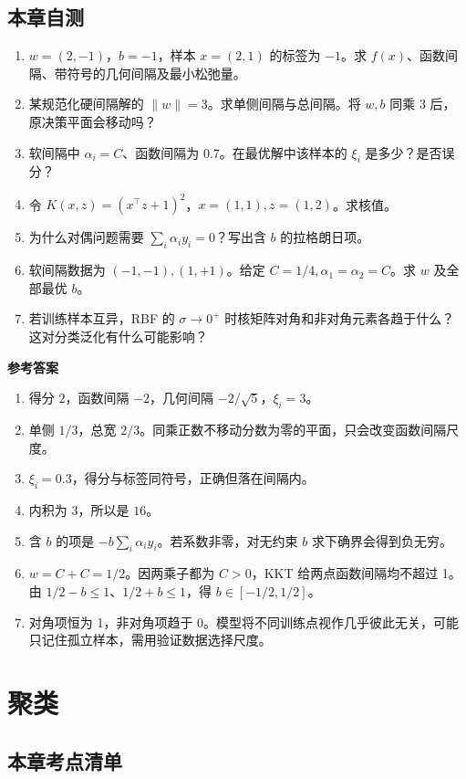 \documentclass[UTF8,a4paper,zihao=-4,fontset=fandol]{ctexrep}
\begin{document}
\section{本章自测}
\begin{enumerate}
\item $w=(2,-1)$，$b=-1$，样本 $x=(2,1)$ 的标签为 $-1$。求 $f(x)$、函数间隔、带符号的几何间隔及最小松弛量。
\item 某规范化硬间隔解的 $\|w\|=3$。求单侧间隔与总间隔。将 $w,b$ 同乘 3 后，原决策平面会移动吗？
\item 软间隔中 $\alpha_i=C$、函数间隔为 $0.7$。在最优解中该样本的 $\xi_i$ 是多少？是否误分？
\item 令 $K(x,z)=(x^\top z+1)^2$，$x=(1,1),z=(1,2)$。求核值。
\item 为什么对偶问题需要 $\sum_i\alpha_i y_i=0$？写出含 $b$ 的拉格朗日项。
\item 软间隔数据为 $(-1,-1),(1,+1)$。给定 $C=1/4,\alpha_1=\alpha_2=C$。求 $w$ 及全部最优 $b$。
\item 若训练样本互异，RBF 的 $\sigma\to0^+$ 时核矩阵对角和非对角元素各趋于什么？这对分类泛化有什么可能影响？
\end{enumerate}
\textbf{参考答案}
\begin{enumerate}
\item 得分 $2$，函数间隔 $-2$，几何间隔 $-2/\sqrt5$，$\xi_i=3$。
\item 单侧 $1/3$，总宽 $2/3$。同乘正数不移动分数为零的平面，只会改变函数间隔尺度。
\item $\xi_i=0.3$，得分与标签同符号，正确但落在间隔内。
\item 内积为 $3$，所以是 $16$。
\item 含 $b$ 的项是 $-b\sum_i\alpha_i y_i$。若系数非零，对无约束 $b$ 求下确界会得到负无穷。
\item $w=C+C=1/2$。因两乘子都为 $C>0$，KKT 给两点函数间隔均不超过 1。由 $1/2-b\le1$、$1/2+b\le1$，得 $b\in[-1/2,1/2]$。
\item 对角项恒为 1，非对角项趋于 0。模型将不同训练点视作几乎彼此无关，可能只记住孤立样本，需用验证数据选择尺度。
\end{enumerate}

\chapter{聚类}

\section{本章考点清单}
\end{document}
